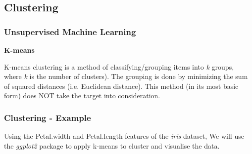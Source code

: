 \documentclass{beamer}\usepackage[]{graphicx}\usepackage[]{color}
\begin{document}

\subsection{Clustering}
\begin{frame}[fragile] \frametitle{Unsupervised Machine Learning}
\textbf{K-means}

K-means clustering is a method of classifying/grouping items into \textit{k} groups, where \textit{k} is the number of clusters). The grouping is done by minimizing the sum of squared distances (i.e. Euclidean distance). This method (in its most basic form) does NOT take the target into consideration.

\end{frame}


\begin{frame}[fragile] \frametitle{Clustering - Example}

\item Using the Petal.width and Petal.length features of the \textit{iris} dataset, We will use the \textit{ggplot2} package to apply k-means to cluster and visualise the data.

\end{frame}

\end{document}

